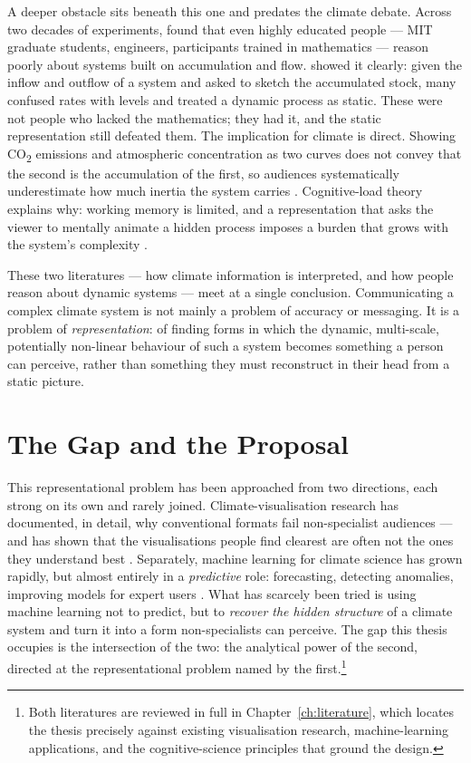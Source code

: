 A deeper obstacle sits beneath this one and predates the climate debate. Across two decades of experiments, \citet{sterman2008} found that even highly educated people --- MIT graduate students, engineers, participants trained in mathematics --- reason poorly about systems built on accumulation and flow. \citet{cronin2009} showed it clearly: given the inflow and outflow of a system and asked to sketch the accumulated stock, many confused rates with levels and treated a dynamic process as static. These were not people who lacked the mathematics; they had it, and the static representation still defeated them. The implication for climate is direct. Showing CO\textsubscript{2} emissions and atmospheric concentration as two curves does not convey that the second is the accumulation of the first, so audiences systematically underestimate how much inertia the system carries \citep{cronin2009, sterman2008}. Cognitive-load theory explains why: working memory is limited, and a representation that asks the viewer to mentally animate a hidden process imposes a burden that grows with the system's complexity \citep{sweller1988}.
 
These two literatures --- how climate information is interpreted, and how people reason about dynamic systems --- meet at a single conclusion. Communicating a complex climate system is not mainly a problem of accuracy or messaging. It is a problem of \emph{representation}: of finding forms in which the dynamic, multi-scale, potentially non-linear behaviour of such a system becomes something a person can perceive, rather than something they must reconstruct in their head from a static picture.


\section{The Gap and the Proposal}
\label{sec:gap-proposal}
 
This representational problem has been approached from two directions, each strong on its own and rarely joined. Climate-visualisation research has documented, in detail, why conventional formats fail non-specialist audiences --- and has shown that the visualisations people find clearest are often not the ones they understand best \citep{harold2016, kause2021}. Separately, machine learning for climate science has grown rapidly, but almost entirely in a \emph{predictive} role: forecasting, detecting anomalies, improving models for expert users \citep{reichstein2019, sonnewald2021}. What has scarcely been tried is using machine learning not to predict, but to \emph{recover the hidden structure} of a climate system and turn it into a form non-specialists can perceive. The gap this thesis occupies is the intersection of the two: the analytical power of the second, directed at the representational problem named by the first.\footnote{Both literatures are reviewed in full in Chapter~\ref{ch:literature}, which locates the thesis precisely against existing visualisation research, machine-learning applications, and the cognitive-science principles that ground the design.}
 
